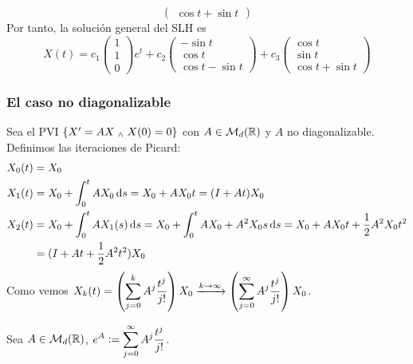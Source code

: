 \begin{ejem}
\begin{itemize}
\[\begin{pmatrix}
				      \cos{t} + \sin{t}
			      \end{pmatrix}\]
		      Por tanto, la solución general del SLH es
		      \[X(t) = c_1 \begin{pmatrix}
				      1 \\
				      1 \\
				      0
			      \end{pmatrix} e^t + c_2 \begin{pmatrix}
				      -\sin{t} \\
				      \cos{t}  \\
				      \cos{t} - \sin{t}
			      \end{pmatrix} + c_3 \begin{pmatrix}
				      \cos{t} \\
				      \sin{t} \\
				      \cos{t} + \sin{t}
			      \end{pmatrix}\]
	\end{itemize}
\end{ejem}

\subsubsection{El caso no diagonalizable}

Sea el PVI $\left\{X' = AX \; _{\wedge} \; X(0) = 0\right\}$ con $A \in \mathcal{M}_d(\mathbb{R})$ y $A$ no diagonalizable. Definimos las iteraciones de Picard:
\[\begin{aligned}
		X_0(t)  & = X_0                                                                                                                     \\
		X_1 (t) & = X_0 +\int_0^t A X_0 \odif{s} = X_0 + AX_0t = (I + At)X_0                                                                \\
		X_2 (t) & = X_0 + \int_0^{t} AX_1(s) \odif{s} = X_0 + \int_0^{t} AX_0 + A^2 X_0 s \odif{s} = X_0 + AX_0 t + \frac{1}{2} A^2 X_0 t^2 \\
		        & = (I + At + \frac{1}{2} A^2 t^2)X_0
	\end{aligned}\]
Como vemos $\displaystyle X_k(t) = \left(\sum_{j=0}^k A^j \frac{t^j}{j!}\right)X_0 \xrightarrow{k\to \infty} \left(\sum_{j=0}^{\infty} A^j \frac{t^j}{j!}\right)X_0$.

\begin{defn}
	Sea $A \in \mathcal{M}_d(\mathbb{R})$, $\displaystyle e^A \vcentcolon= \sum_{j=0}^{\infty} A^j \frac{t^j}{j!}$.
\end{defn}

